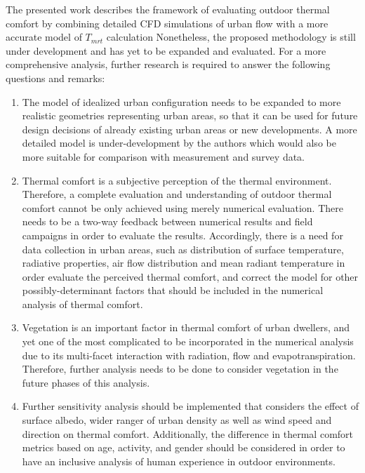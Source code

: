 \documentclass[smallextended]{svjour3}
\begin{document}
The presented work describes the framework of evaluating outdoor thermal comfort by combining detailed CFD simulations of urban flow with a more accurate model of $T_{mrt}$ calculation  Nonetheless, the proposed methodology is still under development and has yet to be expanded and evaluated. For a more comprehensive analysis, further research is required to answer the following questions and remarks:

\begin{enumerate}
\item The model of idealized urban configuration needs to be expanded to more realistic geometries representing urban areas, so that it can be used for future design decisions of already existing urban areas or new developments. A more detailed model is under-development by the authors which would also be more suitable for comparison with measurement and survey data.  
\item	Thermal comfort is a subjective perception of the thermal environment. Therefore, a complete evaluation and understanding of outdoor thermal comfort cannot be only achieved using merely numerical evaluation. There needs to be a two-way feedback between numerical results and field campaigns in order to evaluate the results. Accordingly, there is a need for data collection in urban areas, such as distribution of surface temperature, radiative properties, air flow distribution and mean radiant temperature in order evaluate the perceived thermal comfort, and correct the model for other possibly-determinant factors that should be included in the numerical analysis of thermal comfort. 
\item	Vegetation is an important factor in thermal comfort of urban dwellers, and yet one of the most complicated to be incorporated in the numerical analysis due to its multi-facet interaction with radiation, flow and evapotranspiration.  Therefore, further analysis needs to be done to consider vegetation in the future phases of this analysis.
\item	Further sensitivity analysis should be implemented that considers the effect of surface albedo, wider ranger of urban density as well as wind speed and direction on thermal comfort.  Additionally, the difference in thermal comfort metrics based on age, activity, and gender should be considered in order to have an inclusive analysis of human experience in outdoor environments. 
\end{enumerate}	



{\tiny }

\end{document}

